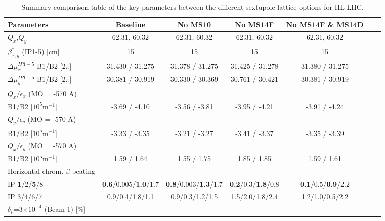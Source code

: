 \documentclass{cernatsnote}
\begin{document}
\begin{landscape}
\begin{table}[h!]
\begin{center}
\caption{\label{tab_circuit_ms10} Summary comparison table of the key parameters between the different sextupole lattice options for HL-LHC.}
\begin{tabular}{|l|c|c|c|c|c|c|} \hline
Parameters   &   Baseline    &   No MS10  &   No MS14F &   No MS14F \& MS14D   \\ \hline

$Q_{x}$,$Q_{y}$         &   62.31, 60.32   &  62.31, 60.32   &  62.31, 60.32  & 62.31, 60.32       \\ \hline
$\beta_{x,y}^{*}$ (IP1-5) [cm]     &      15     &  15      &   15    &     15          \\\hline
$\Delta\mu_{x}^{IP1-5}$ B1/B2 [2$\pi$] &    31.430   / 31.275  &     31.378   / 31.275     &   31.425 / 31.278    & 31.380 / 31.275            \\\hline
$\Delta\mu_{y}^{IP1-5}$ B1/B2 [2$\pi$] &    30.381 / 30.919  &     30.330 / 30.369   &    30.761 / 30.421    &  30.381 / 30.919       \\\hline
$Q_{x} / \epsilon_{x}$ (MO = -570 A) &              &        &           &               \\
B1/B2 [$10^{5}$m$^{-1}$]  &     -3.69 / -4.10          &    -3.56 / -3.81    &      -3.95 / -4.21     &      -3.91 / -4.24         \\\hline

$Q_{y} / \epsilon_{y}$ (MO = -570 A)  &             &        &          &             \\
B1/B2 [$10^{5}$m$^{-1}$]  &      -3.33 / -3.35         &    -3.21 / -3.27    &      -3.41 / -3.37     &      -3.35 / -3.39          \\\hline


$Q_{x} / \epsilon_{y}$ (MO = -570 A) &            &        &         &            \\
B1/B2 [$10^{5}$m$^{-1}$]  &      1.59 / 1.64           &   1.55 / 1.75     &      1.85 / 1.85       &      1.59 / 1.61          \\\hline


Horizontal chrom. $\beta$-beating    &               &            &           &                   \\
IP \textbf{1}/2/\textbf{5}/8 & \textbf{0.6}/0.005/\textbf{1.0}/1.7 &     \textbf{0.8}/0.003/\textbf{1.3}/1.7       &      \textbf{0.2}/0.3/\textbf{1.8}/0.8      &     \textbf{0.1}/0.5/\textbf{0.9}/2.2    \\
IP 3/4/6/7 & 0.9/0.4/1.8/1.1 &   0.9/0.3/1.2/1.5         &      1.5/2.0/1.8/2.4      &    1.2/1.0/0.5/2.2   \\
$\delta_{p}$=3$\times10^{-4}$ (Beam 1) [\%]&     &            &           &       \\\hline



\end{tabular}
\end{center}
\end{table}
\end{landscape}
\end{document}
